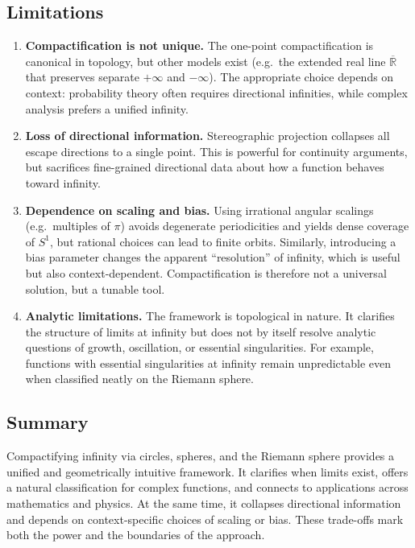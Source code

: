 \documentclass[12pt]{article}
\theoremstyle{remark}
\begin{document}
\subsection{Limitations}

\begin{enumerate}
    \item \textbf{Compactification is not unique.}  
    The one-point compactification is canonical in topology, but other models 
    exist (e.g.\ the extended real line $\overline{\mathbb{R}}$ that preserves 
    separate $+\infty$ and $-\infty$). The appropriate choice depends on 
    context: probability theory often requires directional infinities, while 
    complex analysis prefers a unified infinity.

    \item \textbf{Loss of directional information.}  
    Stereographic projection collapses all escape directions to a single point. 
    This is powerful for continuity arguments, but sacrifices fine-grained 
    directional data about how a function behaves toward infinity.

    \item \textbf{Dependence on scaling and bias.}  
    Using irrational angular scalings (e.g.\ multiples of $\pi$) avoids 
    degenerate periodicities and yields dense coverage of $S^1$, but rational 
    choices can lead to finite orbits. Similarly, introducing a bias parameter 
    changes the apparent “resolution” of infinity, which is useful but also 
    context-dependent. Compactification is therefore not a universal solution, 
    but a tunable tool.

    \item \textbf{Analytic limitations.}  
    The framework is topological in nature. It clarifies the structure of limits 
    at infinity but does not by itself resolve analytic questions of growth, 
    oscillation, or essential singularities. For example, functions with 
    essential singularities at infinity remain unpredictable even when classified 
    neatly on the Riemann sphere.
\end{enumerate}

\subsection{Summary}
Compactifying infinity via circles, spheres, and the Riemann sphere provides a 
unified and geometrically intuitive framework. It clarifies when limits exist, 
offers a natural classification for complex functions, and connects to 
applications across mathematics and physics. At the same time, it collapses 
directional information and depends on context-specific choices of scaling or 
bias. These trade-offs mark both the power and the boundaries of the approach.
\end{document}
